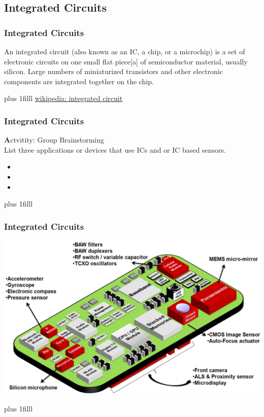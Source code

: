 \documentclass[fleqn]{beamer} %
\newcommand{\sectionIIsubsectionItitle}{Integrated Circuits}
\newcommand{\btVFill}{\vskip0pt plus 1filll}
\begin{document}
		\subsection{\sectionIIsubsectionItitle}\label{sectionIIsubsectionI}

			\begin{frame}[label=sectionIIsubsectionI]
				\frametitle{\sectionIIsubsectionItitle}

				An integrated circuit (also known as an IC, a chip, or a microchip) is a set of electronic circuits on one small flat piece[a] of semiconductor material, usually silicon. Large numbers of miniaturized transistors and other electronic components are integrated together on the chip.	

				\btVFill
				{\tiny\href{https://en.wikipedia.org/wiki/Integrated_circuit}{wikipedia: integrated circuit}}
				
			\end{frame}	


			\begin{frame}[label=sectionIIsubsectionI]
				\frametitle{\sectionIIsubsectionItitle}	

				{\textbf Actvitity:} Group Brainstorming \\
				List three applications or devices that use ICs and or IC based sensors.
				\begin{itemize}
					\item
					\item
					\item
				\end{itemize}


				\btVFill	

			\end{frame}

		    \begin{frame}[label=sectionIIsubsectionI]
				\frametitle{\sectionIIsubsectionItitle}

				\includegraphics[scale=0.45]{images/Mobile_Device_Sensors.png}
	
				\btVFill	
		
			\end{frame}	
\end{document}
